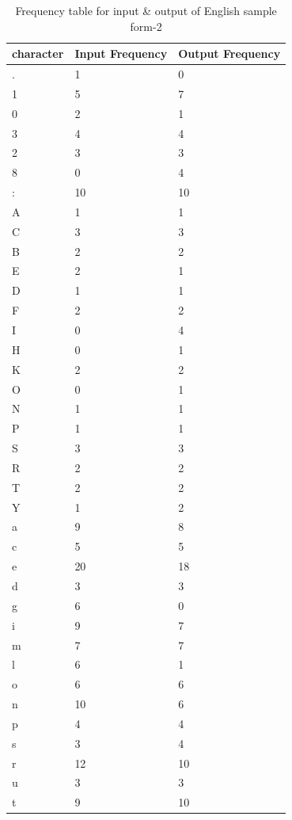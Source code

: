 \begin{table}[H]
\centering
\begin{tabular}{|p{2cm}|p{2cm}|p{2cm}|}
\hline
character & Input Frequency & Output Frequency \\
\hline
. & 1 & 0\\
\hline
1 & 5 & 7\\
\hline
0 & 2 & 1\\
\hline
3 & 4 & 4\\
\hline
2 & 3 & 3\\
\hline
8 & 0 & 4\\
\hline
: & 10 & 10\\
\hline
A & 1 & 1\\
\hline
C & 3 & 3\\
\hline
B & 2 & 2\\
\hline
E & 2 & 1\\
\hline
D & 1 & 1\\
\hline
F & 2 & 2\\
\hline
I & 0 & 4\\
\hline
H & 0 & 1\\
\hline
K & 2 & 2\\
\hline
O & 0 & 1\\
\hline
N & 1 & 1\\
\hline
P & 1 & 1\\
\hline
S & 3 & 3\\
\hline
R & 2 & 2\\
\hline
T & 2 & 2\\
\hline
Y & 1 & 2\\
\hline
a & 9 & 8\\
\hline
c & 5 & 5\\
\hline
e & 20 & 18\\
\hline
d & 3 & 3\\
\hline
g & 6 & 0\\
\hline
i & 9 & 7\\
\hline
m & 7 & 7\\
\hline
l & 6 & 1\\
\hline
o & 6 & 6\\
\hline
n & 10 & 6\\
\hline
p & 4 & 4\\
\hline
s & 3 & 4\\
\hline
r & 12 & 10\\
\hline
u & 3 & 3\\
\hline
t & 9 & 10\\
\hline
\end{tabular}
\caption {Frequency table for input \& output of English sample form-2}
\label {tab:Table2}
\end{table}

